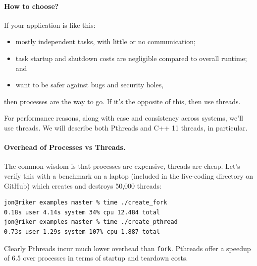 \paragraph{How to choose?}
  If your application is like this:
  \begin{itemize}
    \item mostly independent tasks, with little or no communication;
    \item task startup and shutdown costs are negligible compared to overall runtime; and
    \item want to be safer against bugs and security holes,
  \end{itemize}
then processes are the way to go. If it's the opposite of this, then use threads.

For performance reasons, along with ease and consistency across systems, we'll use threads. We will describe both Pthreads and C++ 11 threads, in particular.

\paragraph{Overhead of Processes vs Threads.} The common wisdom is that processes are
expensive, threads are cheap. Let's verify this with a benchmark on a
laptop (included in the live-coding directory on GitHub) which creates and destroys 50,000 threads:
  \begin{lstlisting}[basicstyle=\scriptsize]
jon@riker examples master % time ./create_fork 
0.18s user 4.14s system 34% cpu 12.484 total
jon@riker examples master % time ./create_pthread 
0.73s user 1.29s system 107% cpu 1.887 total
  \end{lstlisting}

Clearly Pthreads incur much lower overhead than {\tt fork}. Pthreads
offer a speedup of 6.5 over processes in terms of startup and teardown costs.








